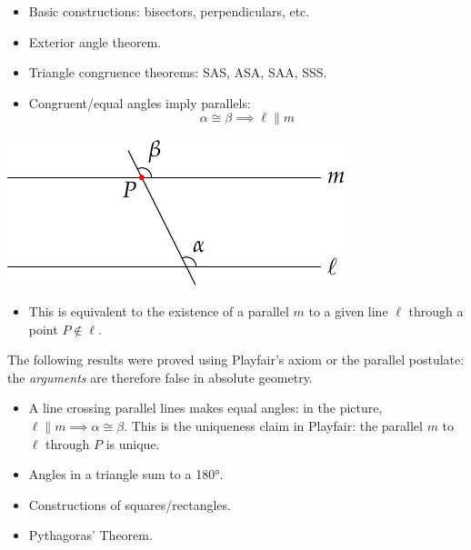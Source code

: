 \begin{minipage}[t]{0.6\linewidth}\vspace{-5pt}
\begin{itemize}\itemsep0pt
  \item Basic constructions: bisectors, perpendiculars, etc.
  \item Exterior angle theorem.
  \item Triangle congruence theorems: SAS, ASA, SAA, SSS.
  \item Congruent/equal angles imply parallels:
  \[\alpha\cong\beta\implies \ell\parallel m\]
\end{itemize}
\end{minipage}\begin{minipage}[t]{0.4\linewidth}\vspace{0pt}
\flushright\includegraphics{history-playfair}
\end{minipage}

\begin{itemize}
  \item[]This is equivalent to the existence of a parallel $m$ to a given line $\ell$ through a point $P\not\in\ell$.
\end{itemize}

\label{pg:absolute}

The following results were proved using Playfair's axiom or the parallel postulate: the \emph{arguments} are therefore false in absolute geometry.
\begin{itemize}
  \item A line crossing parallel lines makes equal angles: in the picture,  $\ell\parallel m\implies \alpha\cong\beta$. This is the uniqueness claim in Playfair: the parallel $m$ to $\ell$ through $P$ is unique.
  \item Angles in a triangle sum to a \ang{180}.
  \item Constructions of squares/rectangles.
  \item Pythagoras' Theorem.
\end{itemize}

